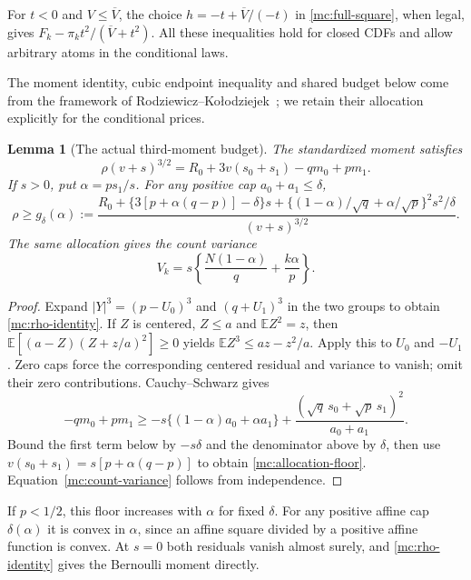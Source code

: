 \documentclass[aop,preprint]{imsart}
\newtheorem{lemma}[theorem]{Lemma}
\theoremstyle{definition}
\newcommand{\E}{\mathbb E}
\numberwithin{equation}{section}
\begin{document}
For $t<0$ and $V\le\overline V$, the choice
$h=-t+\overline V/(-t)$ in \eqref{mc:full-square}, when legal,
gives $F_k-\pi_k t^2/(\overline V+t^2)$. All these inequalities
hold for closed CDFs and allow arbitrary atoms in the conditional laws.

The moment identity, cubic endpoint inequality and shared budget below
come from the framework of Rodziewicz--Ko\l{}odziejek~\cite{RK2026};
we retain their allocation explicitly for the conditional prices.
\begin{lemma}[The actual third-moment budget]\label{mc:budget}
The standardized moment satisfies
\begin{equation}\label{mc:rho-identity}
 \rho(v+s)^{3/2}=R_0+3v(s_0+s_1)-qm_0+pm_1.
\end{equation}
If $s>0$, put $\alpha=ps_1/s$. For any positive cap
$a_0+a_1\le\delta$,
\begin{equation}\label{mc:allocation-floor}
 \rho\ge g_\delta(\alpha):=
 \frac{R_0+\{3[p+\alpha(q-p)]-\delta\}s
 +\{(1-\alpha)/\sqrt q+\alpha/\sqrt p\}^2s^2/\delta}
 {(v+s)^{3/2}}.
\end{equation}
The same allocation gives the count variance
\begin{equation}\label{mc:count-variance}
 V_k=s\left\{\frac{N(1-\alpha)}q+\frac{k\alpha}p\right\}.
\end{equation}
\end{lemma}
\begin{proof}
Expand $|Y|^3=(p-U_0)^3$ and $(q+U_1)^3$ in the two groups to
obtain \eqref{mc:rho-identity}. If $Z$ is centered, $Z\le a$ and
$\E Z^2=z$, then
$\E[(a-Z)(Z+z/a)^2]\ge0$ yields
$\E Z^3\le az-z^2/a$. Apply this to $U_0$ and $-U_1$.
Zero caps force the corresponding centered residual and variance
to vanish; omit their zero contributions. Cauchy--Schwarz gives
\[
 -qm_0+pm_1\ge
 -s\{(1-\alpha)a_0+\alpha a_1\}
 +\frac{(\sqrt q\,s_0+\sqrt p\,s_1)^2}{a_0+a_1}.
\]
Bound the first term below by $-s\delta$ and the denominator
above by $\delta$, then use
$v(s_0+s_1)=s[p+\alpha(q-p)]$ to obtain
\eqref{mc:allocation-floor}. Equation~\eqref{mc:count-variance}
follows from independence.
\end{proof}

If $p<1/2$, this floor increases with $\alpha$ for fixed $\delta$.
For any positive affine cap $\delta(\alpha)$ it is convex in
$\alpha$, since an affine square divided by a positive affine
function is convex. At $s=0$ both residuals vanish almost surely,
and \eqref{mc:rho-identity} gives the Bernoulli moment directly.
\end{document}
